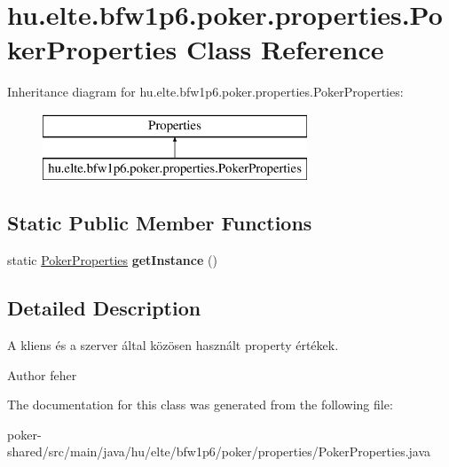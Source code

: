 \hypertarget{classhu_1_1elte_1_1bfw1p6_1_1poker_1_1properties_1_1_poker_properties}{}\section{hu.\+elte.\+bfw1p6.\+poker.\+properties.\+Poker\+Properties Class Reference}
\label{classhu_1_1elte_1_1bfw1p6_1_1poker_1_1properties_1_1_poker_properties}
Inheritance diagram for hu.\+elte.\+bfw1p6.\+poker.\+properties.\+Poker\+Properties\+:\begin{figure}[H]
\begin{center}
\leavevmode
\includegraphics[height=2.000000cm]{classhu_1_1elte_1_1bfw1p6_1_1poker_1_1properties_1_1_poker_properties}
\end{center}
\end{figure}
\subsection*{Static Public Member Functions}
\begin{DoxyCompactItemize}
\item 
\hypertarget{classhu_1_1elte_1_1bfw1p6_1_1poker_1_1properties_1_1_poker_properties_a42406c74bd33664a3a494ffe1e5fbc5d}{}static \hyperlink{classhu_1_1elte_1_1bfw1p6_1_1poker_1_1properties_1_1_poker_properties}{Poker\+Properties} {\bfseries get\+Instance} ()\label{classhu_1_1elte_1_1bfw1p6_1_1poker_1_1properties_1_1_poker_properties_a42406c74bd33664a3a494ffe1e5fbc5d}

\end{DoxyCompactItemize}


\subsection{Detailed Description}
A kliens és a szerver által közösen használt property értékek. \begin{DoxyAuthor}{Author}
feher 
\end{DoxyAuthor}


The documentation for this class was generated from the following file\+:\begin{DoxyCompactItemize}
\item 
poker-\/shared/src/main/java/hu/elte/bfw1p6/poker/properties/Poker\+Properties.\+java\end{DoxyCompactItemize}
